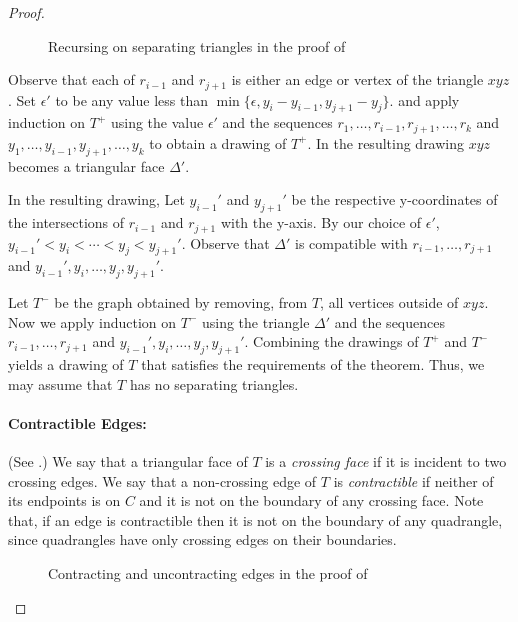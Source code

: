 \documentclass{patmorin}
\begin{document}
\begin{proof}
   \begin{figure}
      \caption{Recursing on separating triangles in the proof of
      }
   \end{figure}

   Observe that each of $r_{i-1}$ and $r_{j+1}$ is either an edge
   or vertex of the triangle $xyz$.  Set $\epsilon'$ to be any
   value less than $\min\{\epsilon,y_{i}-y_{i-1}, y_{j+1}-y_j\}$.
   and apply induction on $T^+$ using the value $\epsilon'$
   and the sequences $r_1,\ldots,r_{i-1},r_{j+1},\ldots,r_k$ and
   $y_1,\ldots,y_{i-1},y_{j+1},\ldots,y_k$ to obtain a drawing of $T^+$.
   In the resulting drawing $xyz$ becomes a triangular face $\Delta'$.

   In the resulting drawing, Let $y_{i-1}'$ and $y_{j+1}'$
   be the respective y-coordinates of the intersections of
   $r_{i-1}$ and $r_{j+1}$ with the y-axis.  By our choice of
   $\epsilon'$, $y_{i-1}'<y_i<\cdots<y_j<y_{j+1}'$.  Observe that
   $\Delta'$ is compatible with $r_{i-1},\ldots,r_{j+1}$ and
   $y_{i-1}',y_i,\ldots,y_j,y_{j+1}'$.

   Let $T^-$ be the graph obtained by removing, from $T$, all
   vertices outside of $xyz$.  Now we apply induction on $T^-$ using
   the triangle $\Delta'$ and the sequences $r_{i-1},\ldots,r_{j+1}$ and
   $y_{i-1}',y_i,\ldots,y_{j},y_{j+1}'$.  Combining the drawings of $T^+$
   and $T^-$ yields a drawing of $T$ that satisfies the requirements of
   the theorem.  Thus, we may assume that $T$ has no separating triangles.

   \paragraph{Contractible Edges:}
   (See .)
   We say that a triangular face of $T$ is a \emph{crossing
   face} if it is incident to two crossing edges.  We say that
   a non-crossing edge of $T$ is \emph{contractible} if neither of its
   endpoints is on $C$ and it is not on the boundary of any 
   crossing face.  Note that, if an edge is contractible then it is
   not on the boundary of any quadrangle, since quadrangles have only
   crossing edges on their boundaries.

   \begin{figure}
      \caption{Contracting and uncontracting edges in the proof of
      }
   \end{figure}


\end{proof}
\end{document}
